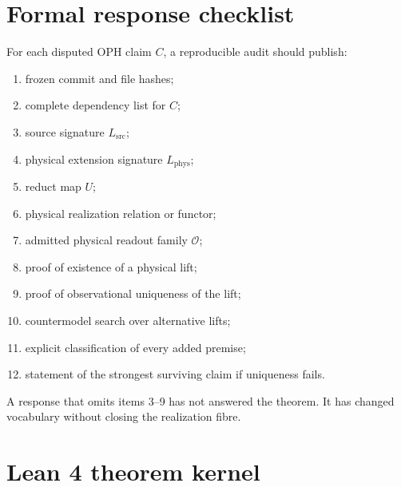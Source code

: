 \documentclass[10pt,a4paper]{article}
\theoremstyle{definition}
\theoremstyle{remark}
\newcommand{\Lsrc}{L_{\mathrm{src}}}
\newcommand{\Lphys}{L_{\mathrm{phys}}}
\newcommand{\Obs}{\mathcal O}
\begin{document}
\clearpage
\appendix

\section{Formal response checklist}
\label{app:checklist}

For each disputed OPH claim \(C\), a reproducible audit should publish:

\begin{enumerate}
\item frozen commit and file hashes;
\item complete dependency list for \(C\);
\item source signature \(\Lsrc\);
\item physical extension signature \(\Lphys\);
\item reduct map \(U\);
\item physical realization relation or functor;
\item admitted physical readout family \(\Obs\);
\item proof of existence of a physical lift;
\item proof of observational uniqueness of the lift;
\item countermodel search over alternative lifts;
\item explicit classification of every added premise;
\item statement of the strongest surviving claim if uniqueness fails.
\end{enumerate}

A response that omits items 3--9 has not answered the theorem.  It has changed
vocabulary without closing the realization fibre.

\section{Lean 4 theorem kernel}
\label{app:lean}

\end{document}

